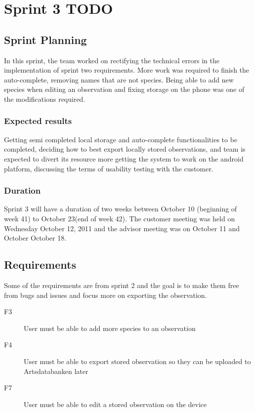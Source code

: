 \section{Sprint 3 TODO}

	\subsection{Sprint Planning}
In this sprint, the team worked on rectifying the technical errors in the implementation of sprint two requirements. More work was required to finish the auto-complete, removing names that are not species. Being able to add new species when editing an observation and fixing storage on the phone was one of the modifications required.
	\subsubsection{Expected results}
Getting semi completed local storage and auto-complete functionalities to be completed, deciding how to best export locally stored observations, and team is expected to divert its resource more getting the system to work on the android platform, discussing the terms of usability testing with the customer.
	\subsubsection{Duration}
Sprint 3 will have a duration of two weeks between October 10 (beginning of week 41) to October 23(end of week 42). The customer meeting was held on Wednesday October 12, 2011 and the advisor meeting was on October 11 and October October 18.
	\subsection{Requirements}
Some of the requirements are from sprint 2 and the goal is to make them free from bugs and issues and focus more on exporting the observation.
\begin{description}

\item[F3] User must be able to add more species to an observation

\item[F4] User must be able to export stored observation so they can be uploaded to Artsdatabanken later

\item[F7] User must be able to edit a stored observation on the device
\end{description}

